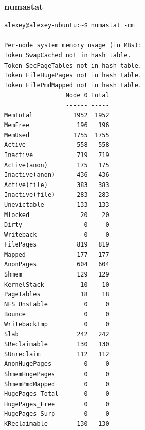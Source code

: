 \subsubsection{numastat}
\begin{verbatim}
alexey@alexey-ubuntu:~$ numastat -cm

Per-node system memory usage (in MBs):
Token SwapCached not in hash table.
Token SecPageTables not in hash table.
Token FileHugePages not in hash table.
Token FilePmdMapped not in hash table.
                 Node 0 Total
                 ------ -----
MemTotal           1952  1952
MemFree             196   196
MemUsed            1755  1755
Active              558   558
Inactive            719   719
Active(anon)        175   175
Inactive(anon)      436   436
Active(file)        383   383
Inactive(file)      283   283
Unevictable         133   133
Mlocked              20    20
Dirty                 0     0
Writeback             0     0
FilePages           819   819
Mapped              177   177
AnonPages           604   604
Shmem               129   129
KernelStack          10    10
PageTables           18    18
NFS_Unstable          0     0
Bounce                0     0
WritebackTmp          0     0
Slab                242   242
SReclaimable        130   130
SUnreclaim          112   112
AnonHugePages         0     0
ShmemHugePages        0     0
ShmemPmdMapped        0     0
HugePages_Total       0     0
HugePages_Free        0     0
HugePages_Surp        0     0
KReclaimable        130   130

\end{verbatim}